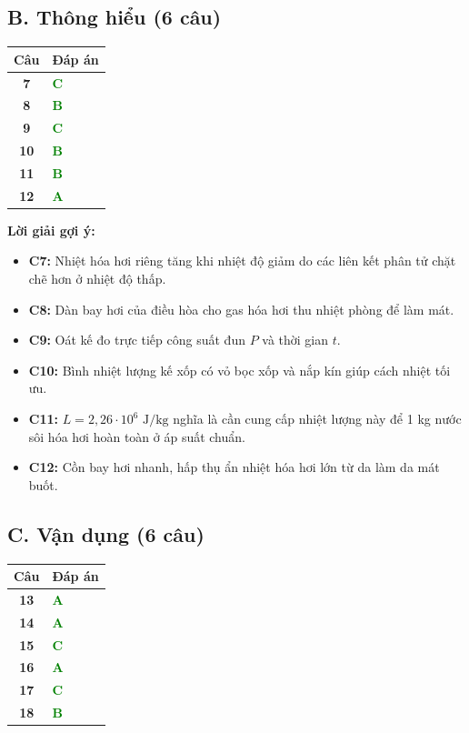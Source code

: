 \documentclass[12pt,a4paper]{article}
\newcommand{\dapan}[1]{\textcolor{green}{\textbf{#1}}}
\begin{document}
\subsection*{B. Thông hiểu (6 câu)}

\begin{longtable}{>{\bfseries}cl}
\toprule
Câu & Đáp án \\ \midrule
7 & \dapan{C} \\ 
8 & \dapan{B} \\ 
9 & \dapan{C} \\ 
10 & \dapan{B} \\ 
11 & \dapan{B} \\ 
12 & \dapan{A} \\ \bottomrule
\end{longtable}

\noindent\textbf{Lời giải gợi ý:}
\begin{itemize}
    \item \textbf{C7:} Nhiệt hóa hơi riêng tăng khi nhiệt độ giảm do các liên kết phân tử chặt chẽ hơn ở nhiệt độ thấp.
    \item \textbf{C8:} Dàn bay hơi của điều hòa cho gas hóa hơi thu nhiệt phòng để làm mát.
    \item \textbf{C9:} Oát kế đo trực tiếp công suất đun $P$ và thời gian $t$.
    \item \textbf{C10:} Bình nhiệt lượng kế xốp có vỏ bọc xốp và nắp kín giúp cách nhiệt tối ưu.
    \item \textbf{C11:} $L = 2{,}26 \cdot 10^6\text{ J/kg}$ nghĩa là cần cung cấp nhiệt lượng này để 1 kg nước sôi hóa hơi hoàn toàn ở áp suất chuẩn.
    \item \textbf{C12:} Cồn bay hơi nhanh, hấp thụ ẩn nhiệt hóa hơi lớn từ da làm da mát buốt.
\end{itemize}

\subsection*{C. Vận dụng (6 câu)}

\begin{longtable}{>{\bfseries}cl}
\toprule
Câu & Đáp án \\ \midrule
13 & \dapan{A} \\ 
14 & \dapan{A} \\ 
15 & \dapan{C} \\ 
16 & \dapan{A} \\ 
17 & \dapan{C} \\ 
18 & \dapan{B} \\ \bottomrule
\end{longtable}
\end{document}
